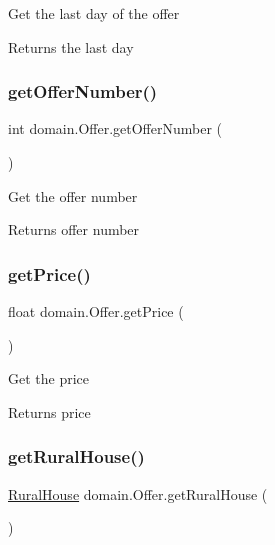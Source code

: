 Get the last day of the offer

\begin{DoxyReturn}{Returns}
the last day 
\end{DoxyReturn}
\mbox{\label{classdomain_1_1_offer_ab9e27c474ec6819a27eac1847d876c3a}} 
\subsubsection{\texorpdfstring{getOfferNumber()}{getOfferNumber()}}
{\footnotesize\ttfamily int domain.\+Offer.\+get\+Offer\+Number (\begin{DoxyParamCaption}{ }\end{DoxyParamCaption})}

Get the offer number

\begin{DoxyReturn}{Returns}
offer number 
\end{DoxyReturn}
\mbox{\label{classdomain_1_1_offer_a4ebf9c6f415709b527e006fdffa3a0c3}} 
\subsubsection{\texorpdfstring{getPrice()}{getPrice()}}
{\footnotesize\ttfamily float domain.\+Offer.\+get\+Price (\begin{DoxyParamCaption}{ }\end{DoxyParamCaption})}

Get the price

\begin{DoxyReturn}{Returns}
price 
\end{DoxyReturn}
\mbox{\label{classdomain_1_1_offer_a3804f5f9ad3a3bf380e55389ccfa9dba}} 
\subsubsection{\texorpdfstring{getRuralHouse()}{getRuralHouse()}}
{\footnotesize\ttfamily \mbox{\hyperlink{classdomain_1_1_rural_house}{Rural\+House}} domain.\+Offer.\+get\+Rural\+House (\begin{DoxyParamCaption}{ }\end{DoxyParamCaption})}

